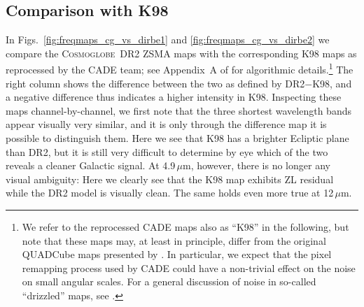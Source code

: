 \documentclass{aa}
\newcommand{\cosmoglobe}{\textsc{Cosmoglobe}}
\begin{document}





\subsection{Comparison with K98}

In Figs.~\ref{fig:freqmaps_cg_vs_dirbe1} and
\ref{fig:freqmaps_cg_vs_dirbe2} we compare the \cosmoglobe\ DR2 ZSMA
maps with the corresponding K98 maps as reprocessed by the CADE team;
see Appendix~A of \citet{paradis:2012} for algorithmic
details.\footnote{We refer to the reprocessed CADE maps also as
``K98'' in the following, but note that these maps may, at least in
principle, differ from the original QUADCube maps presented by
\citet{kelsall1998}. In particular, we expect that the pixel remapping
process used by CADE could have a non-trivial effect on the noise on
small angular scales. For a general discussion of noise in so-called
``drizzled'' maps, see \citet{Fruchter_2002}.} The right column shows
the difference between the two as defined by DR2$-$K98, and a negative
difference thus indicates a higher intensity in K98. Inspecting these
maps channel-by-channel, we first note that the three shortest
wavelength bands appear visually very similar, and it is only through
the difference map it is possible to distinguish them. Here we see
that K98 has a brighter Ecliptic plane than DR2, but it is still very
difficult to determine by eye which of the two reveals a cleaner
Galactic signal. At 4.9$\,\mu$m, however, there is no longer any
visual ambiguity: Here we clearly see that the K98 map exhibits
ZL residual while the DR2 model is visually clean. The
same holds even more true at 12$\,\mu$m.
\end{document}
